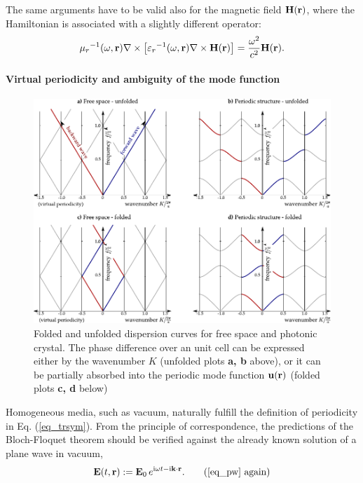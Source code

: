 The same arguments have to be valid also for the magnetic field $\mathbf{H}({\mathbf{r}})$, where the Hamiltonian is associated with a slightly different operator:
\begin{equation}
{\mu_r}^{-1 }(\omega,{\mathbf{r}}) \nabla\times \left[{\varepsilon_r}^{-1}(\omega,{\mathbf{r}}) \nabla\times \mathbf{H}({\mathbf{r}})\right] = \frac{\omega^2}{c^2}\mathbf{H}({\mathbf{r}}).   \label{eq_eigen_h}
\end{equation}

\paragraph{Virtual periodicity and ambiguity of the mode function}%
\begin{figure}[ht] \caption{Folded and unfolded dispersion curves for free space and photonic crystal. The phase difference over an unit cell can be expressed either by the wavenumber $K$ (unfolded plots \textbf{a, b} above), or it can be partially absorbed into the periodic mode function $\mathbf{u}({\mathbf{r}})$ (folded plots \textbf{c, d} below) } \label{fg_phc} \centering  %
	\includegraphics[width=\textwidth]{img/PhC_folding_illustration.pdf} 
\end{figure}
Homogeneous media, such as vacuum, naturally fulfill the definition of periodicity in Eq. (\ref{eq_trsym}).
From the principle of correspondence, the predictions of the Bloch-Floquet theorem should be verified against the already known solution of a plane wave in vacuum, 
\begin{equation} \E(t, \rr) := \E_0\, e^{\ii\omega t - \ii\kk\cdot\rr}. \tag{\ref{eq_pw} \again} \end{equation}
